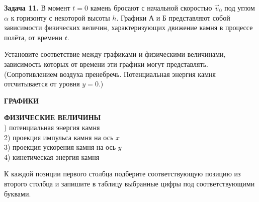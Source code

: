 
\begin{taskbasic}[code={\label{task:dem26_v11_n6}}]
\textbf{Задача 11.} В момент $t=0$ камень бросают с начальной скоростью $\vec{v}_0$ под углом $\alpha$ к горизонту с некоторой высоты $h$. Графики А и Б представляют собой зависимости физических величин, характеризующих движение камня в процессе полёта, от времени $t$. 

Установите соответствие между графиками и физическими величинами, зависимость которых от времени эти графики могут представлять. (Сопротивлением воздуха пренебречь. Потенциальная энергия камня отсчитывается от уровня $y=0$.)

\nopagebreak\smallskip
\begin{center}
\begin{minipage}[b]{0.45\linewidth}
\centering
\textbf{ГРАФИКИ}\\
\smallskip
{}

\vspace{0.5cm}
\end{minipage}
\begin{minipage}[b]{0.5\linewidth}
\textbf{ФИЗИЧЕСКИЕ ВЕЛИЧИНЫ}\\
) потенциальная энергия камня \\
2) проекция импульса камня на ось $x$ \\
3) проекция ускорения камня на ось $y$ \\
4) кинетическая энергия камня \\
\end{minipage}
\end{center}

К каждой позиции первого столбца подберите соответствующую позицию из второго столбца и запишите в таблицу выбранные цифры под соответствующими буквами.

\end{taskbasic}


